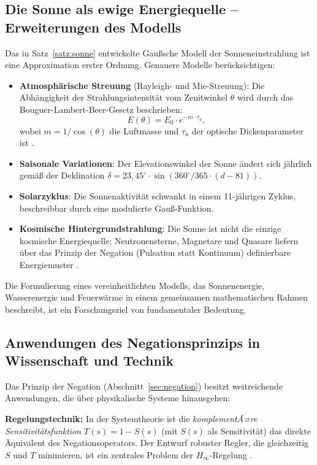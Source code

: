 ﻿\documentclass[a4paper,12pt]{article}
\theoremstyle{definition}
\begin{document}
\subsection{Die Sonne als ewige Energiequelle -- Erweiterungen des Modells}

Das in Satz~\ref{satz:sonne} entwickelte Gau\ss{}sche Modell der Sonneneinstrahlung
ist eine Approximation erster Ordnung. Genauere Modelle ber\"ucksichtigen:

\begin{itemize}
    \item \textbf{Atmosph\"arische Streuung} (Rayleigh- und Mie-Streuung): Die
          Abh\"angigkeit der Strahlungsintensit\"at vom Zenitwinkel $\theta$ wird durch
          das Bouguer-Lambert-Beer-Gesetz beschrieben:
          \[
              E(\theta) = E_0 \cdot e^{-m \cdot \tau_a},
          \]
          wobei $m = 1/\cos(\theta)$ die Luftmasse und $\tau_a$ der optische
          Dickenparameter ist \cite{Iqbal1983}.
    \item \textbf{Saisonale Variationen}: Der Elevationswinkel der Sonne \"andert sich
          j\"ahrlich gem\"a\ss{} der Deklination $\delta = 23{,}45^{\circ} \cdot \sin(360^{\circ}/365 \cdot (d-81))$.
    \item \textbf{Solarzyklus}: Die Sonnenaktivit\"at schwankt in einem 11-j\"ahrigen
          Zyklus, beschreibbar durch eine modulierte Gau\ss{}-Funktion.
    \item \textbf{Kosmische Hintergrundstrahlung}: Die Sonne ist nicht die einzige
          kosmische Energiequelle; Neutronensterne, Magnetare und Quasare liefern
          \"uber das Prinzip der Negation (Pulsation statt Kontinuum) definierbare
          Energiemuster \cite{Longair2011}.
\end{itemize}

Die Formulierung eines vereinheitlichten Modells, das Sonnenenergie, Wasserenergie
und Feuerw\"arme in einem gemeinsamen mathematischen Rahmen beschreibt, ist ein
Forschungsziel von fundamentaler Bedeutung.

\subsection{Anwendungen des Negationsprinzips in Wissenschaft und Technik}

Das Prinzip der Negation (Abschnitt~\ref{sec:negation}) besitzt weitreichende
Anwendungen, die \"uber physikalische Systeme hinausgehen:

\textbf{Regelungstechnik:} In der Systemtheorie ist die \emph{komplementÃ¤re
Sensitivit\"atsfunktion} $T(s) = 1 - S(s)$ (mit $S(s)$ als Sensitivit\"at) das
direkte \"Aquivalent des Negationsoperators. Der Entwurf robuster Regler,
die gleichzeitig $S$ und $T$ minimieren, ist ein zentrales Problem der
$H_\infty$-Regelung \cite{Doyle1992}.
\end{document}
